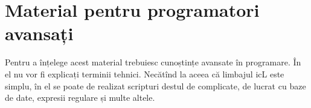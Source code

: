 \part{Material pentru programatori avansați}

Pentru a înțelege acest material trebuiesc cunoștințe avansate în programare. În el nu vor fi explicați terminii tehnici. Necătînd la aceea că limbajul icL este simplu, în el se poate de realizat scripturi destul de complicate, de lucrat cu baze de date, expresii regulare și multe altele.
